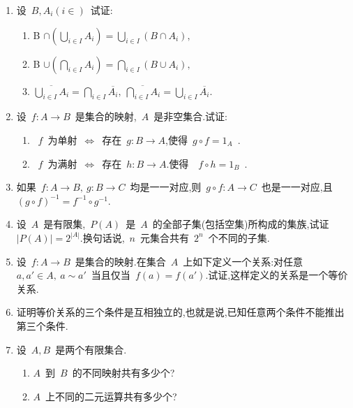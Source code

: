 \xiti
\begin{enumerate}
    \item 设~$B,A_i(i \in )$~试证:\label{xiti:1.1.1}
    \begin{enumerate}
        \item B $\cap\left(\bigcup_{i \in I}A_i\right)=\bigcup_{i \in I}(B\cap A_i),$
        \item B $\cup\left(\bigcap_{i \in I}A_i\right)=\bigcap_{i \in I}(B\cup A_i),$
        \item $\overline{\bigcup_{i \in I}A_i}=\bigcap_{i \in I}\overline{A_i},~
        \overline{\bigcap_{i \in I}A_i}=\bigcup_{i \in I}\overline{A_i}.$
    \end{enumerate}
    \item 设~$f:A \rightarrow B$~是集合的映射,~$A$~是非空集合.试证:\label{xiti:1.1.2}
    \begin{enumerate}
        \item ~$f$~为单射~$\Leftrightarrow$~存在~$g:B \rightarrow A$,使得~$g \circ f=1_A$~.
        \item ~$f$~为满射~$\Leftrightarrow$~存在~$h:B \rightarrow A$.使得~~$f \circ h=1_B$~.
    \end{enumerate}
    \item 如果~$f:A \rightarrow B,~g:B \rightarrow C$~均是一一对应,则~$g \circ f:A \rightarrow C$~也是一一对应,且~$(g \circ f)^{-1}=f^{-1} \circ g^{-1}$.\label{xiti:1.1.3}
    \item 设~$A$~是有限集,~$P(A)$~是~$A$~的全部子集(包括空集)所构成的集族,试证~$|P(A)|=2^{|A|}$.换句话说,~$n$~元集合共有~$2^n$~个不同的子集.\label{xiti:1.1.4}
    \item 设~$f:A \rightarrow B$~是集合的映射.在集合~$A$~上如下定义一个关系:对任意~$a,a' \in A,~a \sim a'$~当且仅当~$f(a)=f(a')$.试证,这样定义的关系是一个等价关系.\label{xiti:1.1.5}
    \item 证明等价关系的三个条件是互相独立的,也就是说,已知任意两个条件不能推出第三个条件.\label{xiti:1.1.6}
    \item 设~$A,B$~是两个有限集合.\label{xiti:1.1.7}
    \begin{enumerate}
        \item $A$~到~$B$~的不同映射共有多少个?
        \item $A$~上不同的二元运算共有多少个?
    \end{enumerate}
\end{enumerate}